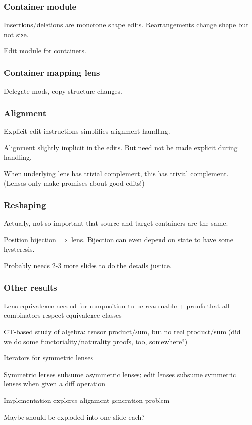 \documentclass{beamer}
\begin{document}
\begin{frame}
    \frametitle{Container module}
    Insertions/deletions are monotone shape edits. Rearrangements change
    shape but not size.

    Edit module for containers.
\end{frame}

\begin{frame}
    \frametitle{Container mapping lens}
    Delegate mods, copy structure changes.
\end{frame}

\begin{frame}
    \frametitle{Alignment}
    Explicit edit instructions simplifies alignment handling.

    Alignment slightly implicit in the edits. But need not be made explicit
    during handling.

    When underlying lens has trivial complement, this has trivial
    complement. (Lenses only make promises about good edits!)
\end{frame}

\begin{frame}
    \frametitle{Reshaping}
    Actually, not so important that source and target containers are the
    same.

    Position bijection $\Rightarrow$ lens. Bijection can even depend on
    state to have some hysteresis.

    Probably needs 2-3 more slides to do the details justice.
\end{frame}

\begin{frame}
    \frametitle{Other results}
    Lens equivalence needed for composition to be reasonable + proofs that
    all combinators respect equivalence classes

    CT-based study of algebra: tensor product/sum, but no real product/sum
    (did we do some functoriality/naturality proofs, too, somewhere?)

    Iterators for symmetric lenses

    Symmetric lenses subsume asymmetric lenses; edit lenses subsume
    symmetric lenses when given a diff operation

    Implementation explores alignment generation problem

    Maybe should be exploded into one slide each?
\end{frame}

\end{document}
